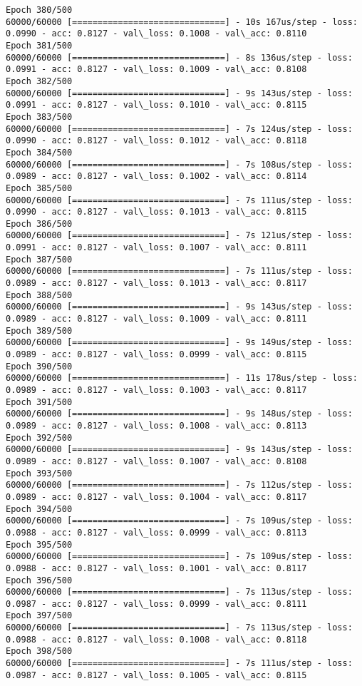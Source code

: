 \documentclass[11pt]{article}
\begin{document}
\begin{Verbatim}[commandchars=\\\{\}]
Epoch 380/500
60000/60000 [==============================] - 10s 167us/step - loss: 0.0990 - acc: 0.8127 - val\_loss: 0.1008 - val\_acc: 0.8110
Epoch 381/500
60000/60000 [==============================] - 8s 136us/step - loss: 0.0991 - acc: 0.8127 - val\_loss: 0.1009 - val\_acc: 0.8108
Epoch 382/500
60000/60000 [==============================] - 9s 143us/step - loss: 0.0991 - acc: 0.8127 - val\_loss: 0.1010 - val\_acc: 0.8115
Epoch 383/500
60000/60000 [==============================] - 7s 124us/step - loss: 0.0990 - acc: 0.8127 - val\_loss: 0.1012 - val\_acc: 0.8118
Epoch 384/500
60000/60000 [==============================] - 7s 108us/step - loss: 0.0989 - acc: 0.8127 - val\_loss: 0.1002 - val\_acc: 0.8114
Epoch 385/500
60000/60000 [==============================] - 7s 111us/step - loss: 0.0990 - acc: 0.8127 - val\_loss: 0.1013 - val\_acc: 0.8115
Epoch 386/500
60000/60000 [==============================] - 7s 121us/step - loss: 0.0991 - acc: 0.8127 - val\_loss: 0.1007 - val\_acc: 0.8111
Epoch 387/500
60000/60000 [==============================] - 7s 111us/step - loss: 0.0989 - acc: 0.8127 - val\_loss: 0.1013 - val\_acc: 0.8117
Epoch 388/500
60000/60000 [==============================] - 9s 143us/step - loss: 0.0989 - acc: 0.8127 - val\_loss: 0.1009 - val\_acc: 0.8111
Epoch 389/500
60000/60000 [==============================] - 9s 149us/step - loss: 0.0989 - acc: 0.8127 - val\_loss: 0.0999 - val\_acc: 0.8115
Epoch 390/500
60000/60000 [==============================] - 11s 178us/step - loss: 0.0989 - acc: 0.8127 - val\_loss: 0.1003 - val\_acc: 0.8117
Epoch 391/500
60000/60000 [==============================] - 9s 148us/step - loss: 0.0989 - acc: 0.8127 - val\_loss: 0.1008 - val\_acc: 0.8113
Epoch 392/500
60000/60000 [==============================] - 9s 143us/step - loss: 0.0989 - acc: 0.8127 - val\_loss: 0.1007 - val\_acc: 0.8108
Epoch 393/500
60000/60000 [==============================] - 7s 112us/step - loss: 0.0989 - acc: 0.8127 - val\_loss: 0.1004 - val\_acc: 0.8117
Epoch 394/500
60000/60000 [==============================] - 7s 109us/step - loss: 0.0988 - acc: 0.8127 - val\_loss: 0.0999 - val\_acc: 0.8113
Epoch 395/500
60000/60000 [==============================] - 7s 109us/step - loss: 0.0988 - acc: 0.8127 - val\_loss: 0.1001 - val\_acc: 0.8117
Epoch 396/500
60000/60000 [==============================] - 7s 113us/step - loss: 0.0987 - acc: 0.8127 - val\_loss: 0.0999 - val\_acc: 0.8111
Epoch 397/500
60000/60000 [==============================] - 7s 113us/step - loss: 0.0988 - acc: 0.8127 - val\_loss: 0.1008 - val\_acc: 0.8118
Epoch 398/500
60000/60000 [==============================] - 7s 111us/step - loss: 0.0987 - acc: 0.8127 - val\_loss: 0.1005 - val\_acc: 0.8115

\end{Verbatim}
\end{document}
